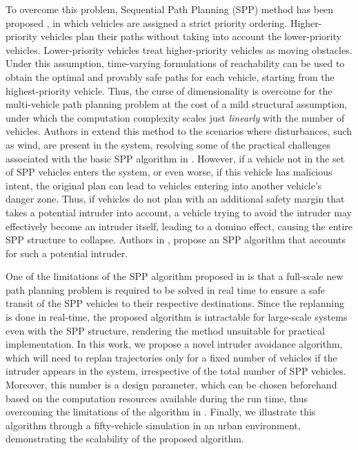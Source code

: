 To overcome this problem, Sequential Path Planning (SPP) method has been proposed \cite{Chen15c}, in which vehicles are assigned a strict priority ordering. Higher-priority vehicles plan their paths without taking into account the lower-priority vehicles. Lower-priority vehicles treat higher-priority vehicles as moving obstacles. Under this assumption, time-varying formulations of reachability \cite{Bokanowski11, Fisac15} can be used to obtain the optimal and provably safe paths for each vehicle, starting from the highest-priority vehicle. Thus, the curse of dimensionality is overcome for the multi-vehicle path planning problem at the cost of a mild structural assumption, under which the computation complexity scales just \textit{linearly} with the number of vehicles. %
Authors in \cite{Bansal2017} extend this method to the scenarios where disturbances, such as wind, are present in the system, resolving some of the practical challenges associated with the basic SPP algorithm in \cite{Chen15c}. However, if a vehicle not in the set of SPP vehicles enters the system, or even worse, if this vehicle has malicious intent, the original plan can lead to vehicles entering into another vehicle’s danger zone. Thus, if vehicles do not plan with an additional safety margin that takes a potential intruder into account, a vehicle trying to avoid the intruder may effectively become an intruder itself, leading to a domino effect, causing the entire SPP structure to collapse. Authors in \cite{chen2016robust}, propose an SPP algorithm that accounts for such a potential intruder.

One of the limitations of the SPP algorithm proposed in \cite{chen2016robust} is that a full-scale new path planning problem is required to be solved in real time to ensure a safe transit of the SPP vehicles to their respective destinations. Since the replanning is done in real-time, the proposed algorithm is intractable for large-scale systems even with the SPP structure, rendering the method unsuitable for practical implementation. In this work, we propose a novel intruder avoidance algorithm, which will need to replan trajectories only for a fixed number of vehicles if the intruder appears in the system, irrespective of the total number of SPP vehicles. Moreover, this number is a design parameter, which can be chosen beforehand based on the computation resources available during the run time, thus overcoming the limitations of the algorithm in \cite{chen2016robust}. Finally, we illustrate this algorithm through a fifty-vehicle simulation in an urban environment, demonstrating the scalability of the proposed algorithm. 

